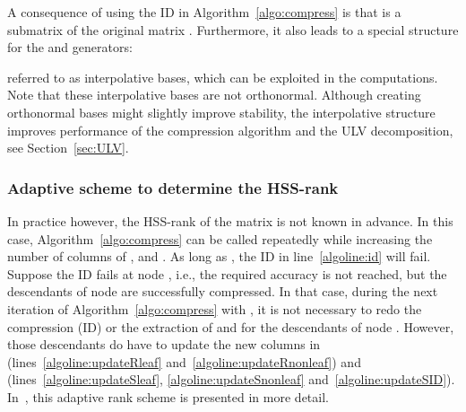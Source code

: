 \documentclass{article}
\newcommand{\ignore}[1]{}
\begin{document}
A consequence of using the ID in Algorithm~\ref{algo:compress} is that
 is a submatrix of the
original matrix . Furthermore, it also leads to a special structure
for the  and  generators:

referred to as interpolative bases, which can be exploited in the
computations. Note that these interpolative bases are not
orthonormal. Although creating orthonormal bases might slightly
improve stability, the interpolative structure improves performance of
the compression algorithm and the ULV decomposition, see
Section~\ref{sec:ULV}.

\subsubsection{Adaptive scheme to determine the HSS-rank}\label{sec:HSS_comp_adaptive}
In practice however, the HSS-rank of the matrix is not known in
advance. In this case, Algorithm~\ref{algo:compress} can be called
repeatedly while increasing the number of columns of ,  and
. As long as , the ID in line~\ref{algoline:id} will
fail. Suppose the ID fails at node , i.e., the required accuracy
 is not reached, but the descendants of node  are
successfully compressed. In that case, during the next iteration of
Algorithm~\ref{algo:compress} with , it is
not necessary to redo the compression (ID) or the extraction of 
and  for the descendants of node . However, those descendants
do have to update the  new columns in 
(lines~\ref{algoline:updateRleaf} and~\ref{algoline:updateRnonleaf})
and  (lines~\ref{algoline:updateSleaf},
\ref{algoline:updateSnonleaf}
and~\ref{algoline:updateSID}). In~\cite{FHR}, this adaptive rank
scheme is presented in more detail.

\ignore{
\subsubsection{Improving the samples by power iteration}\label{sec:power_iteration}
When the singular values of  do not decay fast or  is very
large, the samples  and  can be poor approximations of the
column and row spaces of . In that case, sampling can be done using
 instead of , with  a small integer. Note that
 has the same singular vectors as  but it's singular values
,  decay much
faster. Let

then Algorithm~\ref{algo:compress} can be called with , . Typically,  or  should be sufficient, so when a fast
matrix-vector multiplication is available for , the additional
computational cost is not too bad. However, it might also be necessary
to reorthogonalize the random vectors between each application of 
and . See~\cite{halko2011finding} for more info.
}
\end{document}
